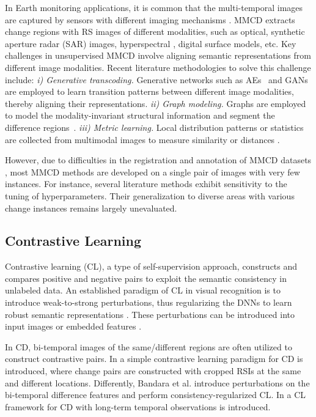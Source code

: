 In Earth monitoring applications, it is common that the multi-temporal images are captured by sensors with different imaging mechanisms \cite{hong2023cross}. MMCD extracts change regions with RS images of different modalities, such as optical, synthetic aperture radar (SAR) images, hyperspectral \cite{liu2019HyperCDReview}, digital surface models, etc. Key challenges in unsupervised MMCD involve aligning semantic representations from different image modalities. Recent literature methodologies to solve this challenge include: \textit{i) Generative transcoding.} Generative networks such as AEs~\cite{liu2018coupling, wu2022CommonalityAE} and GANs \cite{saha2021building, Luppino2024CAAE} are employed to learn transition patterns between different image modalities, thereby aligning their representations. \textit{ii) Graph modeling.} Graphs are employed to model the modality-invariant structural information and segment the difference regions~\cite{sun2021itertivegraph, Chen2022Unsupervised, sun2024LPEM}. \textit{iii) Metric learning.} Local distribution patterns or statistics are collected from multimodal images to measure similarity or distances \cite{prendes2015Multivariate, touati2019multimodal}. 

However, due to difficulties in the registration and annotation of MMCD datasets \cite{lv2022cdhetreview}, most MMCD methods are developed on a single pair of images with very few instances. For instance, several literature methods exhibit sensitivity to the tuning of hyperparameters. Their generalization to diverse areas with various change instances remains largely unevaluated.

\subsection{Contrastive Learning}

Contrastive learning (CL), a type of self-supervision approach, constructs and compares positive and negative pairs to exploit the semantic consistency in unlabeled data. An established paradigm of CL in visual recognition is to introduce weak-to-strong perturbations, thus regularizing the DNNs to learn robust semantic representations \cite{sohn2020fixmatch}. These perturbations can be introduced into input images or embedded features \cite{yang2023revisiting}.

In CD, bi-temporal images of the same/different regions are often utilized to construct contrastive pairs. In \cite{chen2021self} a simple contrastive learning paradigm for CD is introduced, where change pairs are constructed with cropped RSIs at the same and different locations. Differently, Bandara et al. \cite{bandara2022revisiting} introduce perturbations on the bi-temporal difference features and perform consistency-regularized CL. In \cite{mall2023changeaware} a CL framework for CD with long-term temporal observations is introduced.

